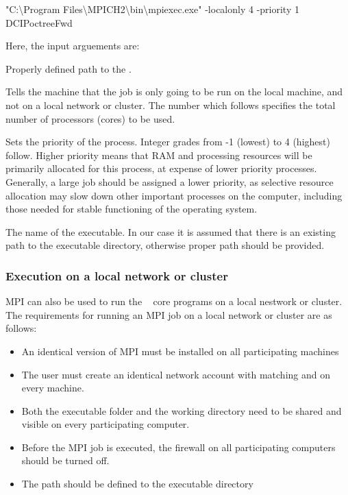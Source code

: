 \begin{fileExample}	
"C:\textbackslash Program Files\textbackslash MPICH2\textbackslash bin\textbackslash mpiexec.exe" -localonly 4 -priority 1  DCIPoctreeFwd
\end{fileExample}

Here, the input arguements are:
\begin{description}[leftmargin=5cm, style=sameline, align=left]
\item[\codeName{PATH}] Properly defined path to the .
\item[\codeName{-localonly}] Tells the machine that the job is only going to be run on the local machine, and not on a local network or cluster. The number which follows  specifies the total number of processors (cores) to be used.
\item[\codeName{-priority \#}] Sets the priority of the process. Integer grades from -1 (lowest) to 4 (highest) follow. Higher priority means that RAM and processing resources will be primarily allocated for this process, at expense of lower priority processes. Generally, a large job should be assigned a lower priority, as selective resource allocation may slow down other important processes on the computer, including those needed for stable functioning of the operating system.
\item[\codeName{DCIPoctreeFwd}] The name of the executable. In our case it is assumed that there is an existing path to the executable directory, otherwise proper path should be provided.
\end{description} 



\subsubsection{Execution on a local network or cluster}

MPI can also be used to run the \programName~ core programs on a local nestwork or cluster. The requirements for running an MPI job on a local network or cluster are as follows:
\begin{itemize}
\item An identical version of MPI must be installed on all participating machines
\item The user must create an identical network account with matching  and  on every machine.
\item Both the executable folder and the working directory need to be shared and visible on every participating computer.
\item Before the MPI job is executed, the firewall on all participating computers should be turned off.
\item The path should be defined to the executable directory
\end{itemize}

